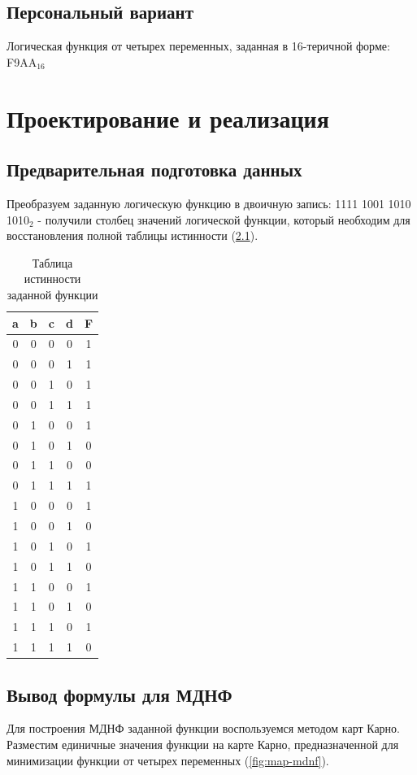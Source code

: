 \documentclass[14pt, a4paper]{extreport}
\begin{document}
\section{Персональный вариант}
Логическая функция от четырех переменных, заданная в 16-теричной форме: F9AA$_{16}$

\chapter{Проектирование и реализация}
\section{Предварительная подготовка данных}
Преобразуем заданную логическую функцию в двоичную запись: 1111 1001 1010 1010$_2$ - получили столбец значений логической функции, который необходим для восстановления полной таблицы истинности (\cref{tab:function-values}).

\begin{table}[!htbp]
	\caption{Таблица истинности заданной функции}
	\label{tab:function-values}
	\begin{tabular}{|c|c|c|c|c|}
		\hline
		a & b & c & d & F \\
		\hline
		0 & 0 & 0 & 0 & 1 \\
		\hline
		0 & 0 & 0 & 1 & 1 \\
		\hline
		0 & 0 & 1 & 0 & 1 \\
		\hline
		0 & 0 & 1 & 1 & 1 \\
		\hline
		0 & 1 & 0 & 0 & 1 \\
		\hline
		0 & 1 & 0 & 1 & 0 \\
		\hline
		0 & 1 & 1 & 0 & 0 \\
		\hline
		0 & 1 & 1 & 1 & 1 \\
		\hline
		1 & 0 & 0 & 0 & 1 \\
		\hline
		1 & 0 & 0 & 1 & 0 \\
		\hline
		1 & 0 & 1 & 0 & 1 \\
		\hline
		1 & 0 & 1 & 1 & 0 \\
		\hline
		1 & 1 & 0 & 0 & 1 \\
		\hline
		1 & 1 & 0 & 1 & 0 \\
		\hline
		1 & 1 & 1 & 0 & 1 \\
		\hline
		1 & 1 & 1 & 1 & 0 \\
		\hline
	\end{tabular}
\end{table}

\section{Вывод формулы для МДНФ}
Для построения МДНФ заданной функции воспользуемся методом карт Карно. Разместим единичные значения функции на карте Карно, предназначенной для минимизации функции от четырех переменных (\cref{fig:map-mdnf}).
\end{document}
